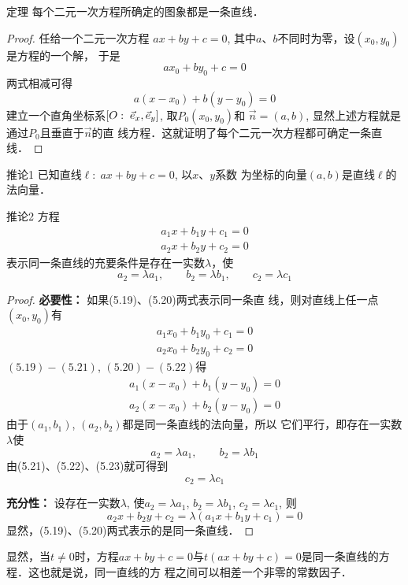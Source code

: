 \begin{blk}
    {定理} 每个二元一次方程所确定的图象都是一条直线．
\end{blk}

\begin{proof}
任给一个二元一次方程
$ax+by+c=0$, 
其中$a$、$b$不同时为零，设$(x_0,y_0)$是方程的一个解，
于是
\[ax_0+by_0+c=0\]
两式相减可得
\[a(x-x_0)+b(y-y_0)=0\]
建立一个直角坐标系$[O:\; \vec{e}_x,\vec{e}_y]$, 取$P_0(x_0,y_0)$和
$\vec{n}=(a,b)$, 显然上述方程就是通过$P_0$且垂直于$\vec{n}$的直
线方程．这就证明了每个二元一次方程都可确定一条直线．
\end{proof}

\begin{blk}{推论1}
    已知直线$\ell:\; ax+by+c=0$, 以$x$、$y$系数
为坐标的向量$(a,b)$是直线$\ell$的法向量．
\end{blk}


\begin{blk}{推论2}
    方程
\begin{align}
    a_1x+b_1y+c_1=0\\
a_2x+b_2y+c_2=0
\end{align}
表示同一条直线的充要条件是存在一实数$\lambda$，使
\[a_2=\lambda a_1,\qquad b_2=\lambda b_1,\qquad  c_2=\lambda c_1\]
\end{blk}

\begin{proof}
\textbf{必要性：} 如果(5.19)、(5.20)两式表示同一条直
线，则对直线上任一点$(x_0,y_0)$有
\begin{align}
a_1x_0+b_1y_0+c_1=0\\
a_2x_0+b_2y_0+c_2=0
\end{align}
$(5.19)-(5.21)$, $(5.20)-(5.22)$得
\[\begin{split}
    a_1(x-x_0)+b_1(y-y_0)=0\\
a_2(x-x_0)+b_2(y-y_0)=0
\end{split}\]
由于$(a_1,b_1)$, $(a_2,b_2)$都是同一条直线的法向量，所以
它们平行，即存在一实数$\lambda$使
\begin{equation}
    a_2=\lambda a_1,\qquad b_2=\lambda b_1
\end{equation}
由(5.21)、(5.22)、(5.23)就可得到
\[c_2=\lambda c_1\]

\textbf{充分性：} 设存在一实数$\lambda$, 使$a_2=\lambda a_1$, $b_2=\lambda b_1$, 
$c_2=\lambda c_1$, 则
\[a_2x+b_2y+c_2=\lambda (a_1x+b_1y+c_1)=0\]
显然，(5.19)、(5.20)两式表示的是同一条直线．
\end{proof}

显然，当$t\ne 0$时，方程$ax+by+c=0$与$t(ax+by
+c)=0$是同一条直线的方程．这也就是说，同一直线的方
程之间可以相差一个非零的常数因子．

